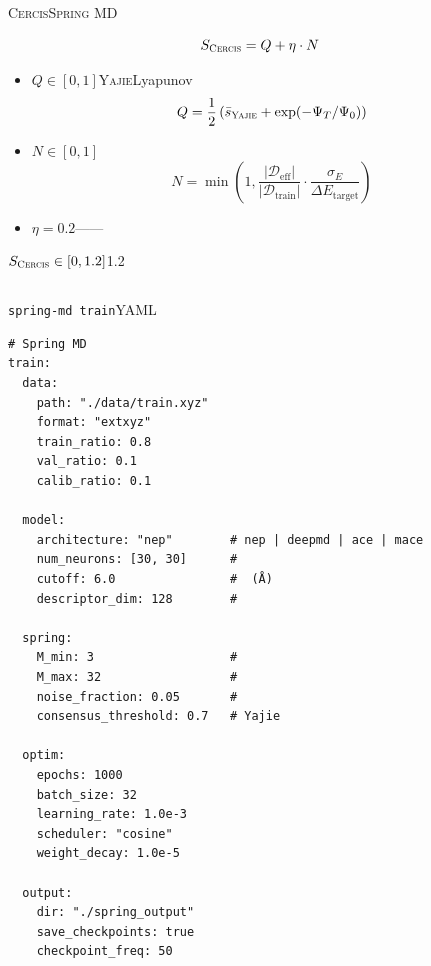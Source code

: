 \documentclass[12pt,a4paper]{article}
\theoremstyle{remark}
\newcommand{\D}{\mathcal{D}}
\newcommand{\Yajie}{\textsc{Yajie}}
\newcommand{\Cercis}{\textsc{Cercis}}
\newcommand{\SpringMD}{\textsc{Spring MD}}
\newcommand{\Lyap}{\ensuremath{\Psi}}
\begin{document}
\Cercis{}\SpringMD{}\cite{scx_spring_trainer}

\begin{equation}\label{eq:cercis_score}
    S_{\Cercis} = Q + \eta \cdot N
\end{equation}


\begin{itemize}[nosep]
    \item $Q \in [0, 1]$\Yajie{}Lyapunov
    \begin{equation}
        Q = \frac{1}{2}\left(\bar{s}_{\Yajie} + \exp(-\Lyap_T / \Lyap_0)\right)
    \end{equation}
    \item $N \in [0, 1]$
    \begin{equation}
        N = \min\left(1, \frac{|\D_{\text{eff}}|}{|\D_{\text{train}}|} \cdot
        \frac{\sigma_E}{\Delta E_{\text{target}}}\right)
    \end{equation}
    \item $\eta = 0.2$——
\end{itemize}

$S_{\Cercis} \in [0, 1.2]$1.2

\subsection{}

\texttt{spring-md train}YAML

\begin{lstlisting}[caption={\texttt{spring\_config.yaml} },label=lst:config]
# Spring MD 
train:
  data:
    path: "./data/train.xyz"
    format: "extxyz"
    train_ratio: 0.8
    val_ratio: 0.1
    calib_ratio: 0.1

  model:
    architecture: "nep"        # nep | deepmd | ace | mace
    num_neurons: [30, 30]      # 
    cutoff: 6.0                #  (Å)
    descriptor_dim: 128        # 

  spring:
    M_min: 3                   # 
    M_max: 32                  # 
    noise_fraction: 0.05       # 
    consensus_threshold: 0.7   # Yajie

  optim:
    epochs: 1000
    batch_size: 32
    learning_rate: 1.0e-3
    scheduler: "cosine"
    weight_decay: 1.0e-5

  output:
    dir: "./spring_output"
    save_checkpoints: true
    checkpoint_freq: 50
\end{lstlisting}

\subsection{}
\end{document}
